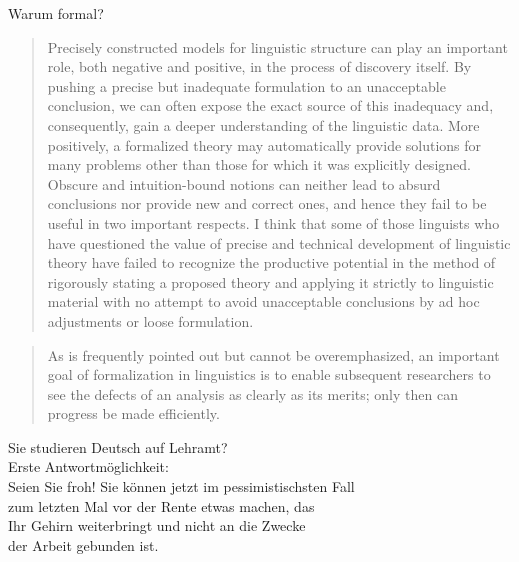 \begin{frame}
  {Warum formal?}
  \onslide<+->
  \onslide<+->
  \begin{quote}\small
    Precisely constructed models for linguistic structure can play an
    important role, both negative and positive, in the process of discovery 
    itself. By pushing a precise but inadequate formulation to
    an unacceptable conclusion, we can often \alert{expose the exact source
    of this inadequacy and, consequently, gain a deeper understanding}
    of the linguistic data. More positively, a formalized theory may 
    \alert{automatically provide solutions for many problems other than those
    for which it was explicitly designed}. Obscure and intuition-bound
    notions can neither lead to absurd conclusions nor provide new and
    correct ones, and hence they fail to be useful in two important respects. 
    I think that some of those linguists who have questioned
    the value of precise and technical development of linguistic theory
    have failed to recognize the productive potential in the method
    of rigorously stating a proposed theory and applying it strictly to
    linguistic material with no attempt to avoid unacceptable conclusions by ad hoc adjustments or loose formulation.
\citep[S.\,5]{Chomsky57a}
  \end{quote}   
  \onslide<+->
  \Halbzeile
  \begin{quote}\small
    As is frequently pointed out but cannot be overemphasized, an important goal
    of formalization in linguistics is to \alert{enable subsequent researchers to see the defects
    of an analysis as clearly as its merits}; only then can progress be made efficiently.
    \citep[S.\,322]{Dowty79a}
  \end{quote}
\end{frame}

\begin{frame}
  {Sie studieren Deutsch auf Lehramt?}
  \onslide<+->
  \onslide<+->
  \centering 
  \\
  \onslide<+->
  \Zeile
  \Large Erste Antwortmöglichkeit:\\
  \onslide<+->
  \Halbzeile
  \alert{Seien Sie froh!} Sie können jetzt im pessimistischsten Fall\\
  zum letzten Mal vor der Rente etwas machen, das \\
  Ihr Gehirn weiterbringt und nicht an die Zwecke \\
  der Arbeit gebunden ist.\\
  \onslide<+->
  \Halbzeile
  \normalsize
\end{frame}


